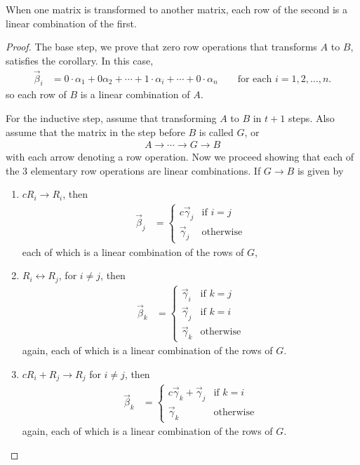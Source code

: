 \begin{corollary} \label{cor:rows:linear:comb}
When one matrix is transformed to another matrix, each row of the second is a linear combination of the first. 
\end{corollary}

\begin{proof}	
The base step, we prove that zero row operations that transforms $A$ to $B$, satisfies the corollary. In this case, 
%
\begin{align*}
\vec{\beta}_i & = 0 \cdot \alpha_1+ 0 \alpha_2 + \cdots + 1 \cdot \alpha_i + \cdots + 0 \cdot \alpha_n \qquad \text{for each $i=1, 2, \ldots, n$}.  
\end{align*}
so each row of $B$ is a linear combination of $A$. 

For the inductive step, assume that transforming $A$ to $B$ in $t+1$ steps.  Also assume that the matrix in the step before $B$ is called $G$, or
%
\begin{align*}
A \rightarrow \cdots \rightarrow G \rightarrow B
\end{align*}
with each arrow denoting a row operation.  Now we proceed showing that each of the 3 elementary row operations are linear combinations.   If $G \rightarrow B$ is given by 

\begin{enumerate}[label=(\roman*)]
\item $c R_i \rightarrow R_i$, then 
%
\begin{align*}
\vec{\beta}_j & = \begin{cases}
c \vec{\gamma}_j & \text{if $i=j$} \\
\vec{\gamma}_j & \text{otherwise} 
\end{cases}
\end{align*}
each of which is a linear combination of the rows of $G$, 
\item $R_i \leftrightarrow R_j$, for $i \neq j$, then 
%
\begin{align*}
\vec{\beta}_k  & = \begin{cases}
\vec{\gamma}_i & \text{if $k=j$} \\
\vec{\gamma}_j & \text{if $k=i$} \\ 
\vec{\gamma}_k & \text{otherwise}
\end{cases}
\end{align*}
again, each of which is a linear combination of the rows of $G$. 

\item $c R_i + R_j \rightarrow R_j$ for $i \neq j$, then 
\begin{align*}
\vec{\beta}_k  & = \begin{cases}
c \vec{\gamma}_k+ \vec{\gamma}_j & \text{if $k=i$} \\ 
\vec{\gamma}_k & \text{otherwise}
\end{cases}
\end{align*}
again, each of which is a linear combination of the rows of $G$. 
 


\end{enumerate}
\end{proof}
